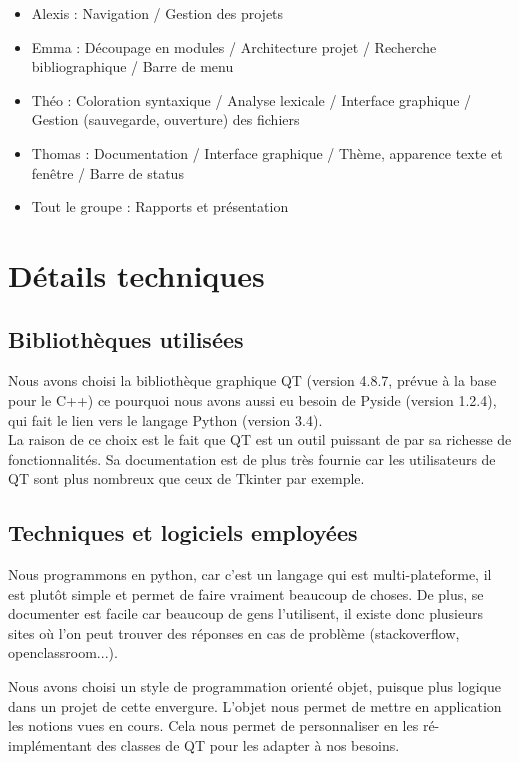\documentclass[a4paper,12pt]{article}
\begin{document}
	\begin{itemize}
		\item Alexis : Navigation / Gestion des projets
		\item Emma : Découpage en modules / Architecture projet / Recherche bibliographique / Barre de menu
		\item Théo : Coloration syntaxique / Analyse lexicale / Interface graphique / Gestion (sauvegarde, ouverture) des fichiers
		\item Thomas : Documentation / Interface graphique / Thème, apparence texte et fenêtre / Barre de status
		\item Tout le groupe : Rapports et présentation 
	\end{itemize}
	
\section{Détails techniques}

	\subsection{Bibliothèques utilisées}
	
	Nous avons choisi la bibliothèque graphique QT (version 4.8.7, prévue à la base pour le C++) ce pourquoi nous avons aussi eu besoin de Pyside (version 1.2.4), qui fait le lien vers le langage Python (version 3.4).\\
	
	La raison de ce choix est le fait que QT est un outil puissant de par sa richesse de fonctionnalités. Sa documentation est de plus très fournie car les utilisateurs de QT sont plus nombreux que ceux de Tkinter par exemple.
	
	\subsection{Techniques et logiciels employées}
	
	Nous programmons en python, car c'est un langage qui est multi-plateforme, il est plutôt simple et permet de faire vraiment beaucoup de choses. De plus, se documenter est facile car beaucoup de gens l'utilisent, il existe donc plusieurs sites où l'on peut trouver des réponses en cas de problème (stackoverflow, openclassroom...).
	
	Nous avons choisi un style de programmation orienté objet, puisque plus logique dans un projet de cette envergure. L'objet nous permet de mettre en application les notions vues en cours. Cela nous permet de personnaliser en les ré-implémentant des classes de QT pour les adapter à nos besoins.\\
	
\end{document}
